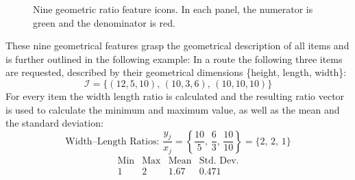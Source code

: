 \begin{figure}[ht]
    \centering

    \vspace{25pt}
    \vspace{25pt}
    \caption[Nine geometric ratio feature icons.]{Nine geometric ratio feature icons. In each panel, the \textcolor{numC}{numerator is green}
        and the \textcolor{denC}{denominator is red}.
        \label{fig:geometrical_ratio_features}}
\end{figure}

These nine geometrical features grasp the geometrical description of all items and is further outlined in the following example:
In a route the following three items are requested, described by their geometrical dimensions \{height, length, width\}:
\[
    \mathcal{I} = \{(12,5,10),\,(10,3,6),\,(10,10,10)\}
\]
For every item the width length ratio is calculated and the resulting ratio vector is used to calculate the minimum and maximum value,
as well as the mean and the standard deviation:
\[
    \text{Width--Length Ratios: }
    \frac{y_j}{x_j} = \left\{\frac{10}{5},\,\frac{6}{3},\,\frac{10}{10}\right\} = \{2,\,2,\,1\}
\]
\[
    \begin{array}{c|c|c|c}
        \text{Min} & \text{Max} & \text{Mean} & \text{Std. Dev.} \\
        \hline
        1          & 2          & 1.67        & 0.471            \\
    \end{array}
\]

